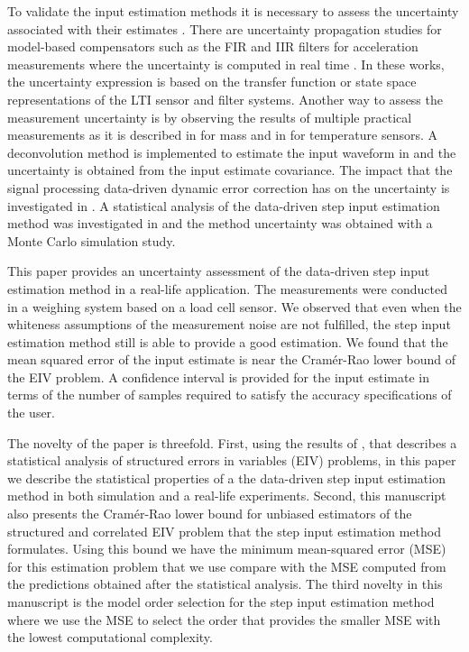 To validate the input estimation methods it is necessary to assess the uncertainty associated with their estimates \cite{daSilva12, Ferrero06}.
There are uncertainty propagation studies for model-based compensators such as the FIR and IIR filters for acceleration measurements where the uncertainty is computed in real time \cite{Elster07, Elster08, Link09}.
In these works, the uncertainty expression is based on the transfer function or state space representations of the LTI sensor and filter systems.
Another way to assess the measurement uncertainty is by observing the results of multiple practical measurements as it is described in \cite{Pietrzak14} for mass and in \cite{Ogorevc16} for temperature sensors.
A deconvolution method is implemented to estimate the input waveform in \cite{Hale09} and the uncertainty is obtained from the input estimate covariance. 
The impact that the signal processing data-driven dynamic error correction has on the uncertainty is investigated in \cite{Saggin01}. 
A statistical analysis of the data-driven step input estimation method \cite{Markovsky15cep} was investigated in \cite{Quintana19} and the method uncertainty was obtained with a Monte Carlo simulation study. 

This paper provides an uncertainty assessment of the data-driven step input estimation method in a real-life application.
The measurements were conducted in a weighing system based on a load cell sensor.
We observed that even when the whiteness assumptions of the measurement noise are not fulfilled, the step input estimation method still is able to provide a good estimation. 
We found that the mean squared error of the input estimate is near the Cram\'er-Rao lower bound of the EIV problem.
A confidence interval is provided for the input estimate in terms of the number of samples required to satisfy the accuracy specifications of the user. 

The novelty of the paper is threefold.
First, using the results of \cite{Quintana19}, that describes a statistical analysis of structured errors in variables (EIV) problems, in this paper we describe the statistical properties of a the data-driven step input estimation method in both simulation and a real-life experiments.
Second, this manuscript also presents the Cram\'er-Rao lower bound for unbiased estimators of the structured and correlated EIV problem that the step input estimation method formulates.
Using this bound we have the minimum mean-squared error (MSE) for this estimation problem that we use compare with the MSE computed from the predictions obtained after the statistical analysis.
The third novelty in this manuscript is the model order selection for the step input estimation method where we use the MSE to select the order that provides the smaller MSE with the lowest computational complexity.




